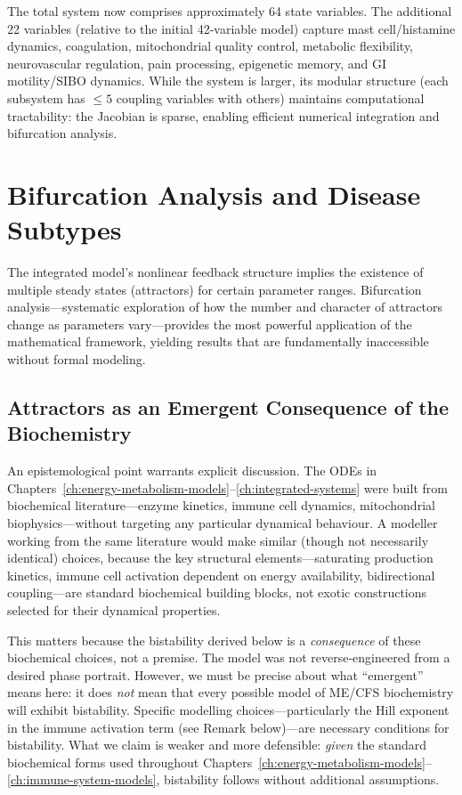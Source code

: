 The total system now comprises approximately 64 state variables. The additional 22 variables (relative to the initial 42-variable model) capture mast cell/histamine dynamics, coagulation, mitochondrial quality control, metabolic flexibility, neurovascular regulation, pain processing, epigenetic memory, and GI motility/SIBO dynamics. While the system is larger, its modular structure (each subsystem has $\leq 5$ coupling variables with others) maintains computational tractability: the Jacobian is sparse, enabling efficient numerical integration and bifurcation analysis.

\section{Bifurcation Analysis and Disease Subtypes}
\label{sec:bifurcation-analysis}

The integrated model's nonlinear feedback structure implies the existence of multiple steady states (attractors) for certain parameter ranges. Bifurcation analysis---systematic exploration of how the number and character of attractors change as parameters vary---provides the most powerful application of the mathematical framework, yielding results that are fundamentally inaccessible without formal modeling.

\subsection{Attractors as an Emergent Consequence of the Biochemistry}
\label{sec:attractors-emergent}

An epistemological point warrants explicit discussion. The ODEs in Chapters~\ref{ch:energy-metabolism-models}--\ref{ch:integrated-systems} were built from biochemical literature---enzyme kinetics, immune cell dynamics, mitochondrial biophysics---without targeting any particular dynamical behaviour. A modeller working from the same literature would make similar (though not necessarily identical) choices, because the key structural elements---saturating production kinetics, immune cell activation dependent on energy availability, bidirectional coupling---are standard biochemical building blocks, not exotic constructions selected for their dynamical properties.

This matters because the bistability derived below is a \emph{consequence} of these biochemical choices, not a premise. The model was not reverse-engineered from a desired phase portrait. However, we must be precise about what ``emergent'' means here: it does \emph{not} mean that every possible model of ME/CFS biochemistry will exhibit bistability. Specific modelling choices---particularly the Hill exponent in the immune activation term (see Remark below)---are necessary conditions for bistability. What we claim is weaker and more defensible: \emph{given} the standard biochemical forms used throughout Chapters~\ref{ch:energy-metabolism-models}--\ref{ch:immune-system-models}, bistability follows without additional assumptions.

